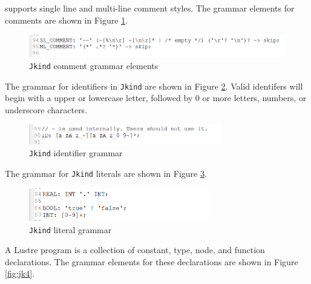 \jkind supports single line and multi-line comment styles. The grammar elements for comments are shown in Figure \ref{fig:jk1}.

 \begin{figure}
 \centering
  \includegraphics[width=\textwidth]{figs/jk1.png}
  \caption{\texttt{Jkind} comment grammar elements}
  \vspace{0.1in}
  \label{fig:jk1}
\end{figure}

The grammar for identifiers in \texttt{Jkind} are shown in Figure \ref{fig:jk2}. Valid identifers will begin with a upper or lowercase letter, followed by 0 or more letters, numbers, or underscore characters.

 \begin{figure}
 \centering
  \includegraphics[width=0.75\textwidth]{figs/jk2.png}
  \caption{\texttt{Jkind} identifier grammar}
  \vspace{0.1in}
  \label{fig:jk2}
\end{figure}

The grammar for \texttt{Jkind} literals are shown in Figure \ref{fig:jk3}.

 \begin{figure}
 \centering
  \includegraphics[width=0.7\textwidth]{figs/jk3.png}
  \caption{\texttt{Jkind} literal grammar}
  \vspace{0.1in}
  \label{fig:jk3}
\end{figure}

A Lustre program is a collection of constant, type, node, and function declarations. The grammar elements for these declarations are shown in Figure \ref{fig:jk4}.

